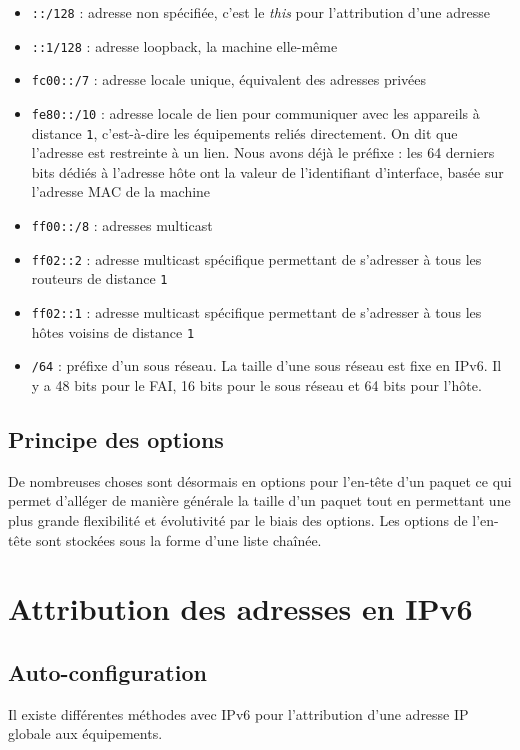 \documentclass[a4paper,11pt,final]{article}
\begin{document}
\begin{itemize}
\item	\texttt{::/128} : adresse non spécifiée, c’est le \emph{this} pour l’attribution d’une adresse\item	\texttt{::1/128} : adresse loopback, la machine elle-même\item	\texttt{fc00::/7} : adresse locale unique, équivalent des adresses privées\item \texttt{fe80::/10} : adresse locale de lien pour communiquer avec les appareils à distance \texttt{1}, c’est-à-dire les équipements reliés directement. On dit que l’adresse est restreinte à un lien. Nous avons déjà le préfixe : les 64 derniers bits dédiés à l’adresse hôte ont la valeur de l’identifiant d’interface, basée sur l’adresse MAC de la machine\item \texttt{ff00::/8} : adresses multicast\item \texttt{ff02::2} : adresse multicast spécifique permettant de s’adresser à tous les routeurs de distance \texttt{1}\item \texttt{ff02::1} : adresse multicast spécifique permettant de s’adresser à tous les hôtes voisins de distance \texttt{1}\item \texttt{/64} : préfixe d’un sous réseau. La taille d’une sous réseau est fixe en IPv6. Il y a 48 bits pour le FAI, 16 bits pour le sous réseau et 64 bits pour l’hôte.
\end{itemize}

\subsection{Principe des options}

De nombreuses choses sont désormais en options pour l’en-tête d’un paquet ce qui permet d’alléger de manière générale la taille d’un paquet tout en permettant une plus grande flexibilité et évolutivité par le biais des options. Les options de l’en-tête sont stockées sous la forme d’une liste chaînée.

\section{Attribution des adresses en IPv6}

\subsection{Auto-configuration}

Il existe différentes méthodes avec IPv6 pour l’attribution d’une adresse IP globale aux équipements.
\end{document}
